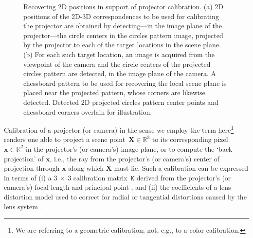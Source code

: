 \documentclass[review]{elsarticle}
\begin{document}
\begin{figure}
    \centering
    \qquad
    \caption{Recovering 2D positions in support of projector calibration. (a) 2D positions of the 2D-3D correspondences to be used for calibrating the projector are obtained by detecting---in the image plane of the projector---the circle centers in the circles pattern image, projected by the projector to each of the target locations in the scene plane. (b) For each such target location, an image is acquired from the viewpoint of the camera and the circle centers of the projected circles pattern are detected, in the image plane of the camera. A chessboard pattern to be used for recovering the local scene plane is placed near the projected pattern, whose corners are likewise detected. Detected 2D projected circles pattern center points and chessboard corners overlain for illustration.}
    \label{fig:2d}
\end{figure}

Calibration of a projector (or camera) in the sense we employ the term here\footnote{We are referring to a geometric calibration; not, e.g., to a color calibration.} renders one able to project a scene point~$\mathbf{X} \in \mathbb{R}^3$ to its corresponding pixel~$\mathbf{x} \in \mathbb{R}^2$ in the projector's (or camera's) image plane, or to compute the `back-projection' of $\mathbf{x}$, i.e., the ray from the projector's (or camera's) center of projection through $\mathbf{x}$ along which $\mathbf{X}$ must lie. Such a calibration can be expressed in terms of (i) a $3~\times{}~3$ calibration matrix~$\mathtt{K}$ derived from the projector's (or camera's) focal length and principal point \cite{Hartley2004}, and (ii) the coefficients of a lens distortion model used to correct for radial or tangential distortions caused by the lens system \cite{duane1971close}.
\end{document}
